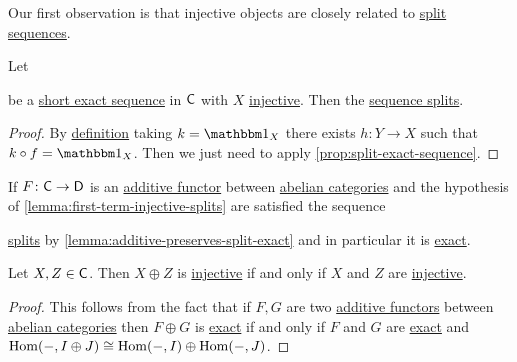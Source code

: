 \documentclass[../../main]{subfiles}
\begin{document}
Our first observation is that injective objects are closely related to \hyperref[prop:split-exact-sequence]{split sequences}.
\begin{lemma}\label{lemma:first-term-injective-splits}
  Let
  \begin{center}
  \end{center}
  be a \hyperref[def:exact-sequence]{short exact sequence} in \(\mathsf{C}\) with \(X\) \hyperref[def:injective-projective-object]{injective}.
  Then the \hyperref[prop:split-exact-sequence]{sequence splits}.
\end{lemma}
\begin{proof}
  By \hyperref[def:injective-projective-object]{definition} taking \(k = \id_{X}\) there exists \(h: Y \to X\) such that \(k \circ f = \id_{X}\).
  Then we just need to apply \autoref{prop:split-exact-sequence}.
\end{proof}

\begin{remark}
  If \(F\colon \mathsf{C} \to \mathsf{D}\) is an \hyperref[def:additive-functor]{additive functor} between \hyperref[def:abelian-category]{abelian categories} and the hypothesis of \autoref{lemma:first-term-injective-splits} are satisfied the sequence
  \begin{center}
  \end{center}
  \hyperref[prop:split-exact-sequence]{splits} by \autoref{lemma:additive-preserves-split-exact} and in particular it is \hyperref[def:exact-sequence]{exact}.
\end{remark}

\begin{lemma}\label{lemma:direct-sum-injective}
  Let \(X, Z \in \mathsf{C}\). Then \(X \oplus Z\) is \hyperref[def:injective-projective-object]{injective} if and only if \(X\) and \(Z\) are \hyperref[def:injective-projective-object]{injective}.
\end{lemma}
\begin{proof}
  This follows from the fact that if \(F, G\) are two \hyperref[def:additive-functor]{additive functors} between \hyperref[def:abelian-category]{abelian categories} then \(F \oplus G\) is \hyperref[def:exact-functor]{exact} if and only if \(F\) and \(G\) are \hyperref[def:exact-functor]{exact} and \(\operatorname{Hom}(-, I \oplus J) \cong \operatorname{Hom}(-, I) \oplus \operatorname{Hom}(-, J)\).
\end{proof}
\end{document}
